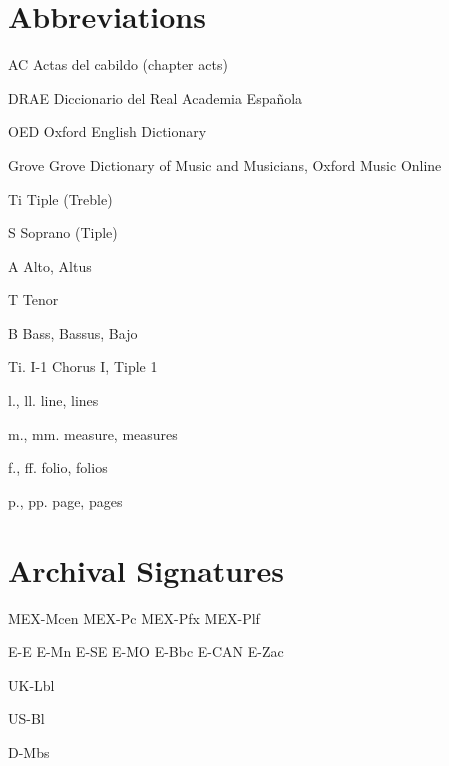 \section{Abbreviations}

AC
Actas del cabildo (chapter acts)

DRAE
Diccionario del Real Academia Española

OED
Oxford English Dictionary

Grove
Grove Dictionary of Music and Musicians, Oxford Music Online

Ti
Tiple (Treble)

S
Soprano (Tiple)

A
Alto, Altus

T
Tenor

B
Bass, Bassus, Bajo

Ti. I-1
Chorus I, Tiple 1

l., ll.
line, lines

m., mm.
measure, measures

f., ff.
folio, folios

p., pp.
page, pages


\section{Archival Signatures}

MEX-Mcen
MEX-Pc
MEX-Pfx
MEX-Plf

E-E
E-Mn
E-SE
E-MO
E-Bbc
E-CAN
E-Zac

UK-Lbl

US-Bl

D-Mbs
\endinput

